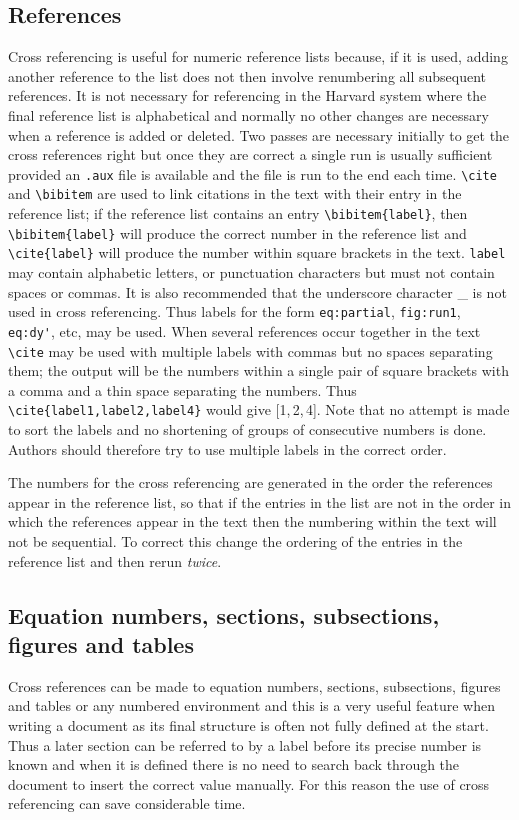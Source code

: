 \subsection{References}
Cross referencing is useful for numeric reference lists because, if it
is used, adding
another reference to the list does not then involve renumbering all
subsequent references. It is not necessary for referencing
in the Harvard system where the final reference list is alphabetical
and normally no other changes are necessary when a reference is added or
deleted.
Two passes are necessary initially to get the cross references right
but once they are correct a single run is usually sufficient provided an
\verb".aux" file is available and the file
is run to the end each time.
\verb"\cite" and \verb"\bibitem" are used to link citations in the text
with their entry in the reference list;
if the
reference list contains an entry \verb"\bibitem{label}",
then \verb"\bibitem{label}"
will produce the correct number in the reference list and
\verb"\cite{label}" will produce the number within square brackets in the
text. \verb"label" may contain alphabetic letters,
or punctuation characters but must not contain spaces or commas. It is also
recommended that the underscore character \_{} is not used in cross
referencing.
Thus labels for the form
\verb"eq:partial", \verb"fig:run1", \verb"eq:dy'",
etc, may be used. When several
references occur together in the text \verb"\cite" may be used with
multiple labels with commas but no spaces separating them;
the output will be the
numbers within a single pair of square brackets with a comma and a
thin space separating the numbers. Thus \verb"\cite{label1,label2,label4}"
would give [1,\,2,\,4]. Note that no attempt is made to sort the
labels and no shortening of groups of consecutive numbers is done.
Authors should therefore try to use multiple labels in the correct
order.

The numbers for the cross referencing are generated in the order the
references appear in the reference list, so that if the entries in the
list are not in the order in which the references appear in the text
then the
numbering within the text will not be sequential. To correct this
change the ordering of the entries in the reference list and then
rerun {\it twice}.

\subsection{Equation numbers, sections, subsections, figures and
tables}
Cross references can be made to equation numbers, sections,
subsections, figures and tables or
any numbered environment
and this is a very useful feature when
writing a document as its final structure is often not fully defined
at the start. Thus a later section can be referred to by a label
before its precise number is known and when it is defined there is no
need to search back through the document to insert the correct value
manually. For this reason the use of cross referencing
can save considerable time.

